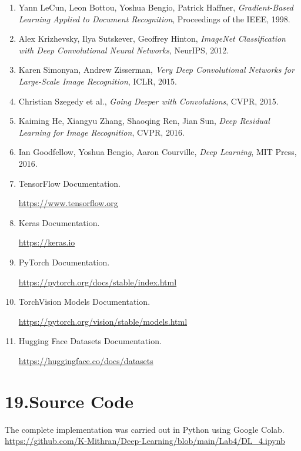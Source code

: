 \documentclass[11pt,a4paper]{article}
\begin{document}
\begin{enumerate}

\item Yann LeCun,
Leon Bottou,
Yoshua Bengio,
Patrick Haffner,
\textit{Gradient-Based Learning Applied to Document Recognition},
Proceedings of the IEEE,
1998.

\item Alex Krizhevsky,
Ilya Sutskever,
Geoffrey Hinton,
\textit{ImageNet Classification with Deep Convolutional Neural Networks},
NeurIPS,
2012.

\item Karen Simonyan,
Andrew Zisserman,
\textit{Very Deep Convolutional Networks for Large-Scale Image Recognition},
ICLR,
2015.

\item Christian Szegedy et al.,
\textit{Going Deeper with Convolutions},
CVPR,
2015.

\item Kaiming He,
Xiangyu Zhang,
Shaoqing Ren,
Jian Sun,
\textit{Deep Residual Learning for Image Recognition},
CVPR,
2016.

\item Ian Goodfellow,
Yoshua Bengio,
Aaron Courville,
\textit{Deep Learning},
MIT Press,
2016.

\item TensorFlow Documentation.

\url{https://www.tensorflow.org}

\item Keras Documentation.

\url{https://keras.io}

\item PyTorch Documentation.

\url{https://pytorch.org/docs/stable/index.html}

\item TorchVision Models Documentation.

\url{https://pytorch.org/vision/stable/models.html}

\item Hugging Face Datasets Documentation.

\url{https://huggingface.co/docs/datasets}

\end{enumerate}

\section*{19.Source Code}

The complete implementation was carried out in Python using Google Colab.
\\[10pt]
\url{https://github.com/K-Mithran/Deep-Learning/blob/main/Lab4/DL_4.ipynb}
\\[10pt]

\vfill
\end{document}
